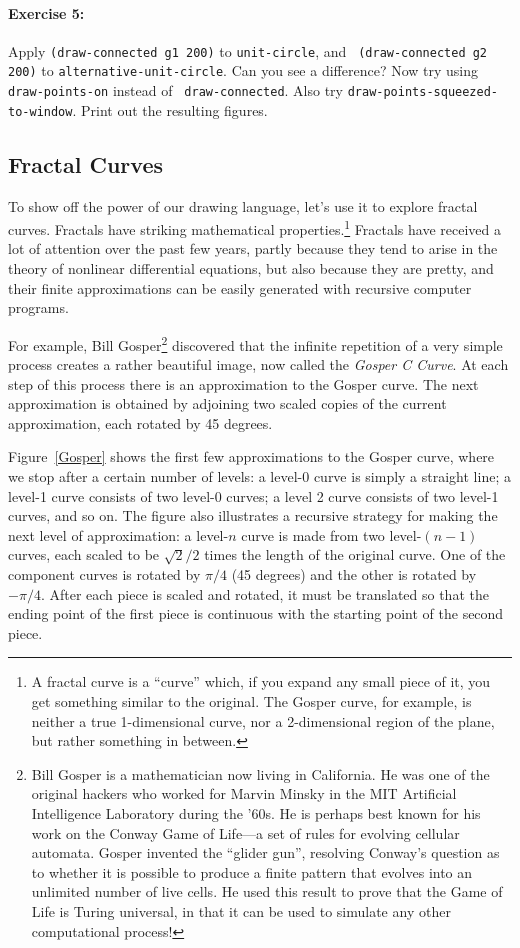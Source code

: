 \paragraph{Exercise 5:}
Apply {\tt (draw-connected g1 200)} to {\tt unit-circle}, and {\tt
(draw-connected g2 200)} to {\tt alternative-unit-circle}.  Can you see a
difference?  Now try using {\tt draw-points-on} instead of {\tt
draw-connected}.  Also try {\tt draw-points-squeezed-to-window}.  Print
out the resulting figures.

\subsection{Fractal Curves}

To show off the power of our drawing language, let's use it to explore
fractal curves.  Fractals have striking mathematical
properties.\footnote{A fractal curve is a ``curve'' which, if you
expand any small piece of it, you get something similar to the
original.  The Gosper curve, for example, is neither a true
1-dimensional curve, nor a 2-dimensional region of the plane, but
rather something in between.} Fractals have received a lot of
attention over the past few years, partly because they tend to arise
in the theory of nonlinear differential equations, but also because
they are pretty, and their finite approximations can be easily
generated with recursive computer programs.

For example, Bill Gosper\footnote{Bill Gosper is a mathematician now
living in California.  He was one of the original hackers who worked
for Marvin Minsky in the MIT Artificial Intelligence Laboratory during
the '60s.  He is perhaps best known for his work on the Conway Game of
Life---a set of rules for evolving cellular automata.  Gosper invented
the ``glider gun'', resolving Conway's question as to whether it is
possible to produce a finite pattern that evolves into an unlimited
number of live cells.  He used this result to prove that the Game of
Life is Turing universal, in that it can be used to simulate any other
computational process!} discovered that the infinite repetition of a
very simple process creates a rather beautiful image, now called the
{\em Gosper C Curve}.  At each step of this process there is an
approximation to the Gosper curve.  The next approximation is obtained
by adjoining two scaled copies of the current approximation, each
rotated by 45 degrees.

Figure~\ref{Gosper} shows the first few approximations to the Gosper
curve, where we stop after a certain number of levels: a level-0 curve
is simply a straight line; a level-1 curve consists of two level-0
curves; a level 2 curve consists of two level-1 curves, and so on.
The figure also illustrates a recursive strategy for making the next
level of approximation: a level-$n$ curve is made from two
level-$(n-1)$ curves, each scaled to be ${\sqrt 2}/2$ times the length
of the original curve.  One of the component curves is rotated by
$\pi/4$ (45 degrees) and the other is rotated by $-\pi/4$.  After each
piece is scaled and rotated, it must be translated so that the ending
point of the first piece is continuous with the starting point of the
second piece.

